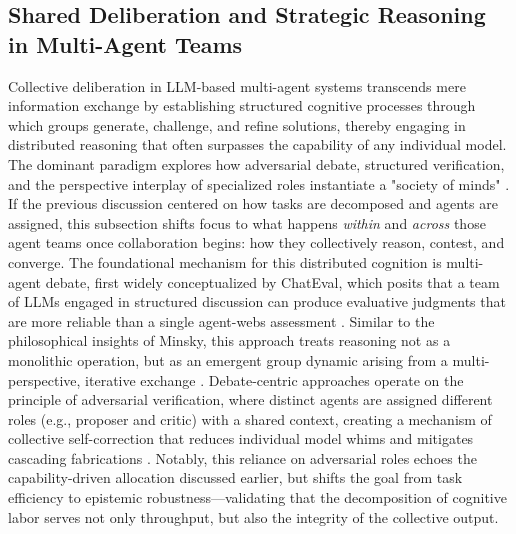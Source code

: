 \documentclass[11pt,a4paper]{article}
\begin{document}
\subsection{Shared Deliberation and Strategic Reasoning in Multi-Agent Teams}


Collective deliberation in LLM-based multi-agent systems transcends mere information exchange by establishing structured cognitive processes through which groups generate, challenge, and refine solutions, thereby engaging in distributed reasoning that often surpasses the capability of any individual model. The dominant paradigm explores how adversarial debate, structured verification, and the perspective interplay of specialized roles instantiate a "society of minds" \cite{arxiv:2309.07864v3}. If the previous discussion centered on how tasks are decomposed and agents are assigned, this subsection shifts focus to what happens \emph{within} and \emph{across} those agent teams once collaboration begins: how they collectively reason, contest, and converge. The foundational mechanism for this distributed cognition is multi-agent debate, first widely conceptualized by ChatEval, which posits that a team of LLMs engaged in structured discussion can produce evaluative judgments that are more reliable than a single agent-webs assessment \cite{arxiv:2308.07201v1}. Similar to the philosophical insights of Minsky, this approach treats reasoning not as a monolithic operation, but as an emergent group dynamic arising from a multi-perspective, iterative exchange \cite{arxiv:2309.07864v3}. Debate-centric approaches operate on the principle of adversarial verification, where distinct agents are assigned different roles (e.g., proposer and critic) with a shared context, creating a mechanism of collective self-correction that reduces individual model whims and mitigates cascading fabrications \cite{arxiv:2308.07201v1,arxiv:2310.02124v2}. Notably, this reliance on adversarial roles echoes the capability-driven allocation discussed earlier, but shifts the goal from task efficiency to epistemic robustness---validating that the decomposition of cognitive labor serves not only throughput, but also the integrity of the collective output.
\end{document}
